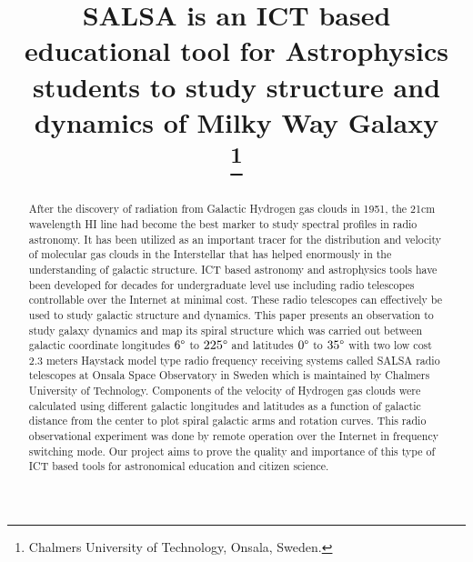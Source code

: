 \documentclass[10pt,conference]{IEEEtran}
\begin{document}
\title{SALSA is an ICT based educational tool for Astrophysics students to study structure and dynamics of Milky Way Galaxy\\
{\footnotesize}
\thanks{Chalmers University of Technology, Onsala, Sweden.}
}

\author{
\and
{}
}

\maketitle

\begin{abstract}
After the discovery of radiation from Galactic Hydrogen gas clouds in 1951, the 21cm wavelength HI line had become the best marker to study spectral profiles in radio astronomy. It has been utilized as an important tracer for the distribution and velocity of molecular gas clouds in the Interstellar that has helped enormously in the understanding of galactic structure. ICT based astronomy and astrophysics tools have been developed for decades for undergraduate level use including radio telescopes controllable over the Internet at minimal cost. These radio telescopes can effectively be used to study galactic structure and dynamics. This paper presents an observation to study galaxy dynamics and map its spiral structure which was carried out between galactic coordinate longitudes $6\degree$ to $225\degree$ and latitudes $0\degree$ to $35\degree$ with two low cost $2.3$ meters Haystack model type radio frequency receiving systems called SALSA radio telescopes at Onsala Space Observatory in Sweden which is maintained by Chalmers University of Technology. Components of the velocity of Hydrogen gas clouds were calculated using different galactic longitudes and latitudes as a function of galactic distance from the center to plot spiral galactic arms and rotation curves. This radio observational experiment was done by remote operation over the Internet in frequency switching mode. Our project aims to prove the quality and importance of this type of ICT based tools for astronomical education and citizen science.
\end{abstract}
\end{document}
